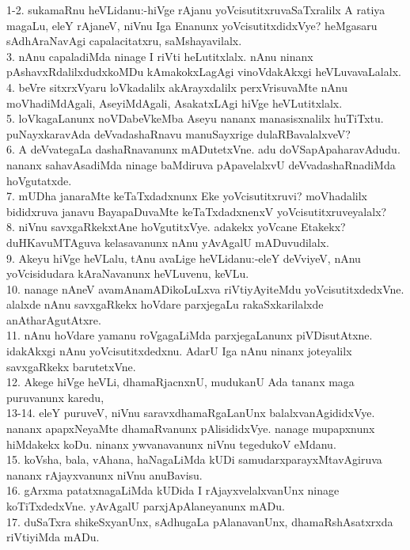 \documentclass{article}
\begin{document}
1-2. sukamaRnu heVLidanu:-hiVge rAjanu yoVcisutitxruvaSaTxralilx A ratiya magaLu, eleY rAjaneV, niVnu Iga Enanunx yoVcisutitxdidxVye? heMgasaru sAdhAraNavAgi capalacitatxru, saMshayavilalx.\\
3. nAnu capaladiMda ninage I riVti heLutitxlalx. nAnu ninanx pAshavxRdalilxdudxkoMDu kAmakokxLagAgi vinoVdakAkxgi heVLuvavaLalalx.\\
4. beVre sitxrxVyaru loVkadalilx akArayxdalilx perxVrisuvaMte nAnu moVhadiMdAgali, AseyiMdAgali, AsakatxLAgi hiVge heVLutitxlalx.\\
5. loVkagaLanunx noVDabeVkeMba Aseyu nananx manasisxnalilx huTiTxtu. puNayxkaravAda deVvadashaRnavu manuSayxrige dulaRBavalalxveV?\\
6. A deVvategaLa dashaRnavanunx mADutetxVne. adu doVSapApaharavAdudu. nananx sahavAsadiMda ninage baMdiruva pApavelalxvU deVvadashaRnadiMda hoVgutatxde.\\
7. mUDha janaraMte keTaTxdadxnunx Eke yoVcisutitxruvi? moVhadalilx bididxruva janavu BayapaDuvaMte keTaTxdadxnenxV yoVcisutitxruveyalalx?\\
8. niVnu savxgaRkekxtAne hoVgutitxVye. adakekx yoVcane Etakekx? duHKavuMTAguva kelasavanunx nAnu yAvAgalU mADuvudilalx.\\
9. Akeyu hiVge heVLalu,  tAnu avaLige heVLidanu:-eleY deVviyeV, nAnu yoVcisidudara kAraNavanunx heVLuvenu, keVLu.\\
10. nanage nAneV avamAnamADikoLuLxva riVtiyAyiteMdu yoVcisutitxdedxVne. alalxde nAnu savxgaRkekx hoVdare parxjegaLu rakaSxkarilalxde anAtharAgutAtxre.\\
11. nAnu hoVdare yamanu roVgagaLiMda parxjegaLanunx piVDisutAtxne. idakAkxgi nAnu yoVcisutitxdedxnu. AdarU Iga nAnu ninanx joteyalilx savxgaRkekx barutetxVne.\\
12. Akege hiVge heVLi, dhamaRjacnxnU, mudukanU Ada tananx maga puruvanunx karedu,\\
13-14. eleY puruveV, niVnu saravxdhamaRgaLanUnx balalxvanAgididxVye. nananx apapxNeyaMte dhamaRvanunx pAlisididxVye. nanage mupapxnunx hiMdakekx koDu. ninanx ywvanavanunx niVnu tegedukoV eMdanu.\\
15. koVsha, bala, vAhana, haNagaLiMda kUDi samudarxparayxMtavAgiruva nananx rAjayxvanunx niVnu anuBavisu.\\
16. gArxma patatxnagaLiMda kUDida I rAjayxvelalxvanUnx ninage koTiTxdedxVne. yAvAgalU parxjApAlaneyanunx mADu.\\
17. duSaTxra shikeSxyanUnx, sAdhugaLa pAlanavanUnx, dhamaRshAsatxrxda riVtiyiMda mADu.\\
\end{document}
